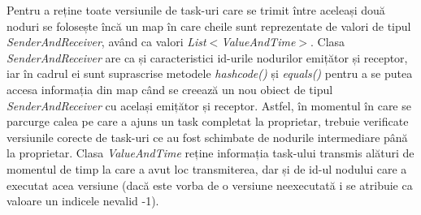 \documentclass[12pt,a4paper]{report}
\begin{document}
Pentru a reține toate versiunile de task-uri care se trimit între aceleași două noduri se folosește încă un map în care cheile sunt reprezentate de valori de tipul \textit{SenderAndReceiver}, având ca valori \textit{List$<$ValueAndTime$>$}. Clasa \textit{SenderAndReceiver} are ca și caracteristici id-urile nodurilor emițător și receptor, iar în cadrul ei sunt suprascrise metodele \textit{hashcode()} și \textit{equals()} pentru a se putea accesa informația din map când se creează un nou obiect de tipul \textit{SenderAndReceiver} cu același emițător și receptor. Astfel, în momentul în care se parcurge calea pe care a ajuns un task completat la proprietar, trebuie verificate versiunile corecte de task-uri ce au fost schimbate de nodurile intermediare până la proprietar. Clasa \textit{ValueAndTime} reține informația task-ului transmis alături de momentul de timp la care a avut loc transmiterea, dar și de id-ul nodului care a executat acea versiune (dacă este vorba de o versiune neexecutată i se atribuie ca valoare un indicele nevalid -1).
\end{document}
